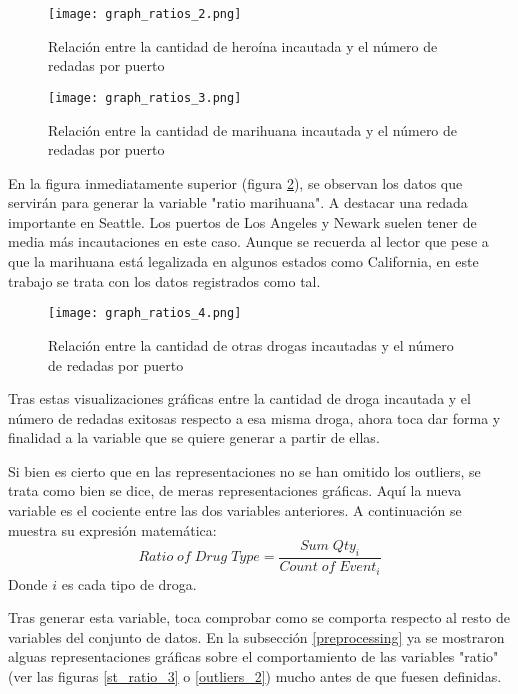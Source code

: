 \documentclass[12pt]{article}
\begin{document}
		\begin{figure}[H]
			\caption{\label{graph_ratios_2} Relación entre la cantidad de heroína incautada y el número de redadas por puerto}
			\centering
			\hspace*{1cm}
			\texttt{[image: graph\_ratios\_2.png]}
		\end{figure}
	
		\begin{figure}[H]
			\caption{\label{graph_ratios_3} Relación entre la cantidad de marihuana incautada y el número de redadas por puerto}
			\centering
			\hspace*{1cm}
			\texttt{[image: graph\_ratios\_3.png]}
		\end{figure}
	
		En la figura inmediatamente superior (figura \ref{graph_ratios_3}), se observan los datos que servirán para generar la variable "ratio marihuana". A destacar una redada importante en Seattle. Los puertos de Los Angeles y Newark suelen tener de media más incautaciones en este caso. Aunque se recuerda al lector que pese a que la marihuana está legalizada en algunos estados como California, en este trabajo se trata con los datos registrados como tal.
	
		\begin{figure}[H]
			\caption{\label{graph_ratios_4} Relación entre la cantidad de otras drogas incautadas y el número de redadas por puerto}
			\centering
			\hspace*{1cm}
			\texttt{[image: graph\_ratios\_4.png]}
		\end{figure}
		
		Tras estas visualizaciones gráficas entre la cantidad de droga incautada y el número de redadas exitosas respecto a esa misma droga, ahora toca dar forma y finalidad a la variable que se quiere generar a partir de ellas.
		
		Si bien es cierto que en las representaciones no se han omitido los outliers, se trata como bien se dice, de meras representaciones gráficas. Aquí la nueva variable es el cociente entre las dos variables anteriores. A continuación se muestra su expresión matemática: 
		$$
		Ratio\; of\; Drug\; Type = \frac{Sum\; Qty_i}{Count\; of\; Event_i}
		$$
		Donde $i$ es cada tipo de droga.
		
		Tras generar esta variable, toca comprobar como se comporta respecto al resto de variables del conjunto de datos. En la subsección \ref{preprocessing} ya se mostraron alguas representaciones gráficas sobre el comportamiento de las variables "ratio" (ver las figuras \ref{st_ratio_3} o \ref{outliers_2}) mucho antes de que fuesen definidas.
		
\end{document}
